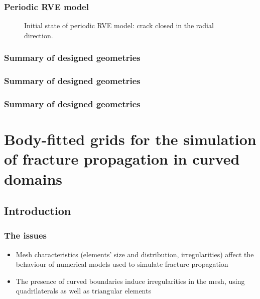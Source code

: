 \documentclass[first,firstsupp,lastsupp,handout,last,hyperref,table]{ETHclass}
\begin{document}
\begin{frame}
\frametitle{Periodic RVE model}
\vspace{-0.75cm}
\centering
\begin{figure}[!h]
\centering
  \caption{\scriptsize Initial state of periodic RVE model: crack closed in the radial direction.}
  \label{fig:periodicRVE_onlycc}
\end{figure}
\end{frame}

\begin{frame}
\frametitle{Summary of designed geometries}
\vspace*{-0.25cm}
\centering

\end{frame}

\begin{frame}
\frametitle{Summary of designed geometries}
\vspace*{-0.25cm}
\centering

\end{frame}

\begin{frame}
\frametitle{Summary of designed geometries}
\vspace*{-0.25cm}
\centering

\end{frame}

\section[Body-fitted grids]{Body-fitted grids for the simulation of fracture propagation in curved domains}

\subsection{Introduction}


\begin{frame}[t]
  \frametitle{The issues}
  \begin{itemize}
  \justifying
   \item {\scriptsize Mesh characteristics (elements' size and distribution, irregularities) affect the behaviour of numerical models used to simulate fracture propagation}
\item {\scriptsize The presence of curved boundaries induce irregularities in the mesh, using quadrilaterals as well as triangular elements}
  \end{itemize}
\end{frame}
\end{document}
